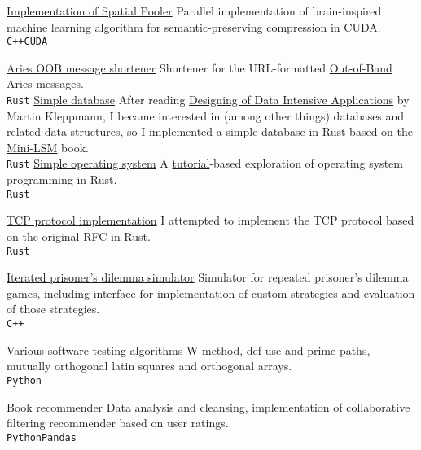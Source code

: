 \documentclass[9pt]{developercv} %
\begin{document}
\begin{entrylist}
	\entry
		{}
		{\href{https://github.com/mirgee/sp_cuda}{Implementation of Spatial Pooler}}
		{}
		{Parallel implementation of brain-inspired machine learning algorithm for semantic-preserving compression in CUDA.
          \\\texttt{C++}\slashsep\texttt{CUDA}
        }

	\entry
		{}
		{\href{https://github.com/AbsaOSS/aries-oob-shortener}{Aries OOB message shortener}}
		{}
    {Shortener for the URL-formatted \href{https://github.com/hyperledger/aries-rfcs/blob/main/features/0434-outofband/README.md}{Out-of-Band} Aries messages.\\
         \texttt{Rust}}
	\entry
		{}
		{\href{https://github.com/mirgee/mini-lsm}{Simple database}}
		{}
    {After reading \href{https://www.goodreads.com/en/book/show/23463279-designing-data-intensive-applications}{Designing of Data Intensive Applications} by Martin Kleppmann, I became interested in (among other things) databases and related data structures, so I implemented a simple database in Rust based on the \href{https://skyzh.github.io/mini-lsm/}{Mini-LSM} book.\\
         \texttt{Rust}}
	\entry
		{}
		{\href{https://github.com/mirgee/rust-os}{Simple operating system}}
		{}
    {A \href{https://os.phil-opp.com/}{tutorial}-based exploration of operating system programming in Rust.\\
         \texttt{Rust}}

	\entry
		{}
		{\href{https://github.com/mirgee/tcp}{TCP protocol implementation}}
		{}
    {I attempted to implement the TCP protocol based on the \href{https://www.rfc-editor.org/rfc/rfc793}{original RFC} in Rust.\\
         \texttt{Rust}}

	\entry
		{}
		{\href{https://github.com/mirgee/iterated_prisoner-s_dilemma}{Iterated prisoner's dilemma simulator}}
		{}
		{Simulator for repeated prisoner's dilemma games, including interface for implementation of custom strategies and evaluation of those strategies.
          \\\texttt{C++}
        }

	\entry
		{}
		{\href{https://github.com/mirgee/w_method}{Various software testing algorithms}}
		{}
		{W method, def-use and prime paths, mutually orthogonal latin squares and orthogonal arrays.
         \\\texttt{Python}
        }

	\entry
		{}
		{\href{https://github.com/mirgee/book_recommender}{Book recommender}}
		{}
		{Data analysis and cleansing, implementation of collaborative filtering recommender based on user ratings.
         \\\texttt{Python}\slashsep\texttt{Pandas}
        }


\end{entrylist}
\end{document}
